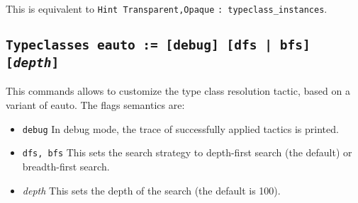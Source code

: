 This is equivalent to {\tt Hint Transparent,Opaque} {\ident} {\tt: typeclass\_instances}.

\subsection{\tt Typeclasses eauto := [debug] [dfs | bfs] [\emph{depth}]}
\label{TypeclassesEauto}

This commands allows to customize the type class resolution tactic,
based on a variant of eauto. The flags semantics are:
\begin{itemize}
\item {\tt debug} In debug mode, the trace of successfully applied
  tactics is printed.
\item {\tt dfs, bfs} This sets the search strategy to depth-first search
  (the default) or breadth-first search.
\item {\emph{depth}} This sets the depth of the search (the default is 100).
\end{itemize}

